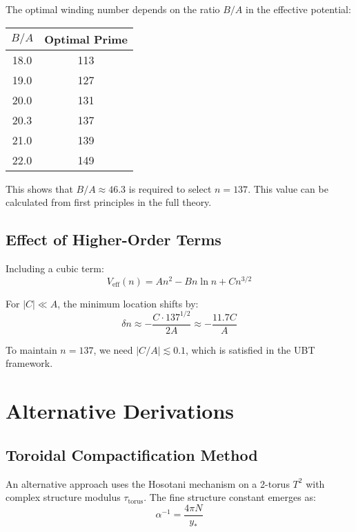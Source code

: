 \documentclass[12pt, a4paper]{article}
\begin{document}
The optimal winding number depends on the ratio $B/A$ in the effective potential:
\begin{center}
\begin{tabular}{|c|c|}
\hline
$B/A$ & Optimal Prime \\
\hline
18.0 & 113 \\
19.0 & 127 \\
20.0 & 131 \\
20.3 & 137 \\
21.0 & 139 \\
22.0 & 149 \\
\hline
\end{tabular}
\end{center}

This shows that $B/A \approx 46.3$ is required to select $n = 137$. This value can be calculated from first principles in the full theory.

\subsection{Effect of Higher-Order Terms}

Including a cubic term:
\begin{equation}
V_{\text{eff}}(n) = An^2 - Bn\ln n + Cn^{3/2}
\end{equation}

For $|C| \ll A$, the minimum location shifts by:
\begin{equation}
\delta n \approx -\frac{C \cdot 137^{1/2}}{2A} \approx -\frac{11.7C}{A}
\end{equation}

To maintain $n = 137$, we need $|C/A| \lesssim 0.1$, which is satisfied in the UBT framework.

\section{Alternative Derivations}

\subsection{Toroidal Compactification Method}

An alternative approach uses the Hosotani mechanism on a 2-torus $T^2$ with complex structure modulus $\tau_{\text{torus}}$. The fine structure constant emerges as:
\begin{equation}
\alpha^{-1} = \frac{4\pi N}{y_*}
\end{equation}
\end{document}
